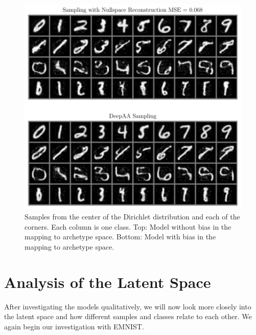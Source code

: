 \begin{figure}[htpb]
	\centering
        \includegraphics{figures/samples/aa_nullspace_bias_y.pdf}
        \caption{Samples from the center of the Dirichlet distribution and each
        of the corners. Each column is one class. Top: Model without bias in
        the mapping to archetype space. Bottom: Model with bias in the mapping to
        archetype space.}%
        \label{fig:aa_nullspace_bias}
\end{figure}

\section{Analysis of the Latent Space}%
\label{sec:analysis_of_the_latent_space}

After investigating the models qualitatively, we will now look more closely
into the latent space and how different samples and classes relate to each
other. We again begin our investigation with EMNIST.

